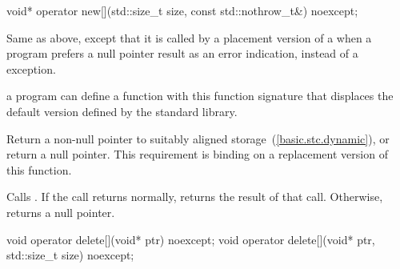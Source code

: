 %
\begin{itemdecl}
void* operator new[](std::size_t size, const std::nothrow_t&) noexcept;
\end{itemdecl}

\begin{itemdescr}
\pnum
\effects
Same as above, except that it is called by a placement version of a
when a \Cpp program prefers a null pointer result as an error indication,
instead of a
exception.

\pnum
\replaceable
a \Cpp program can define a
function with this function signature that displaces the default version
defined by the \Cpp standard library.

\pnum
\required
Return a non-null pointer to suitably aligned storage~(\ref{basic.stc.dynamic}),
or return a null pointer.
This requirement is binding on a replacement version of this function.

\pnum
{}
Calls . If the call returns normally,
returns the result of that call. Otherwise, returns a null pointer.
\end{itemdescr}

%
\begin{itemdecl}
void operator delete[](void* ptr) noexcept;
void operator delete[](void* ptr, std::size_t size) noexcept;
\end{itemdecl}


